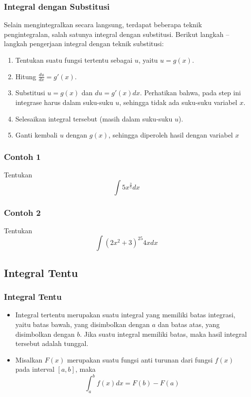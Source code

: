 \documentclass[pdflatex,compress,mathserif]{beamer}
\begin{document}
		\begin{frame}
			\frametitle{Integral dengan Substitusi}
			Selain mengintegralkan secara langsung, terdapat beberapa teknik pengintegralan, salah satunya integral dengan substitusi. Berikut langkah – langkah pengerjaan integral dengan teknik substitusi:
			\begin{enumerate}
				\item Tentukan suatu fungsi tertentu sebagai $ u $, yaitu $ u = g(x) $.
				\item Hitung $ \frac{du}{dx} = g'(x) $.
				\item Substitusi $ u = g(x) $ dan $ du = g'(x)dx $. Perhatikan bahwa, pada step ini integrase harus dalam suku-suku $ u $, sehingga tidak ada suku-suku variabel $ x $.
				\item Selesaikan integral tersebut (masih dalam suku-suku $ u $).
				\item Ganti kembali $ u $ dengan $ g(x) $, sehingga diperoleh hasil dengan variabel $ x $
			\end{enumerate}
		\end{frame}
		
		\begin{frame}
			\frametitle{Contoh 1}
			Tentukan $$ \int 5x^{\frac{3}{5}} dx $$
			\vfill
		\end{frame}
		
		\begin{frame}
			\frametitle{Contoh 2}
			Tentukan $$ \int(2x^2+3)^{25}4xdx $$
			\vfill
		\end{frame}
	
	\subsection{Integral Tentu}
	
		\begin{frame}
			\frametitle{Integral Tentu}
			\begin{itemize}
				\item Integral tertentu merupakan suatu integral yang memiliki batas integrasi, yaitu batas bawah, yang disimbolkan dengan $ a $ dan batas atas, yang disimbolkan dengan $ b $. Jika suatu integral memiliki batas, maka hasil integral tersebut adalah tunggal.
				\item Misalkan $ F(x) $ merupakan suatu fungsi anti turunan dari fungsi $ f(x) $ pada interval $ [a, b] $, maka
				\begin{equation}
					\int_{a}^{b} f(x) dx = F(b) - F(a)
				\end{equation}
			\end{itemize}
		\end{frame}
	
\end{document}
